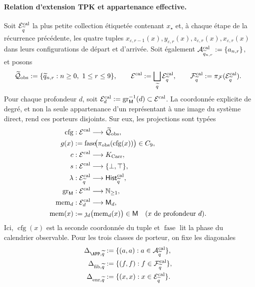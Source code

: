 \paragraph{Relation d’extension TPK et appartenance effective.}
Soit \(\mathcal E^{\rm cal}_{\widetilde q}\) la plus petite collection étiquetée contenant \(x_\star\) et, à chaque étape de la récurrence précédente, les quatre tuples \(x_{\varepsilon,r-1}(x),\allowbreak y_{\varepsilon,r}(x),\allowbreak
z_{\varepsilon,r}(x),\allowbreak x_{\varepsilon,r}(x)\) dans leurs configurations de départ et d'arrivée. Soit également \(\mathcal A^{\rm cal}_{\widetilde q_{n,r}}:=\{a_{n,r}\}\), et posons
\[
 \widetilde{\mathcal Q}_{\rm obs}:=
   \{\widetilde q_{n,r}:n\ge0,\ 1\le r\le9\},
 \qquad
 \mathcal E^{\rm cal}:=\bigsqcup_{\widetilde q}
     \mathcal E^{\rm cal}_{\widetilde q},
 \qquad
 \mathcal F^{\rm cal}_{\widetilde q}:=
     \pi_{\mathcal F}(\mathcal E^{\rm cal}_{\widetilde q}).
\]
Pour chaque profondeur \(d\), soit
\(\mathcal E^{\rm cal}_d:=
\operatorname{gr}_{\mathsf M}^{-1}(d)\subset\mathcal E^{\rm cal}\). La
coordonnée explicite de degré, et non la seule appartenance d’un représentant à
une image du système direct, rend ces porteurs disjoints. Sur eux,
les projections sont typées
\[
\begin{aligned}
 \operatorname{cfg}&:\mathcal E^{\rm cal}\longrightarrow
     \widetilde{\mathcal Q}_{\rm obs},\\
 g(x)&:=\operatorname{fase}\!
       \bigl(\pi_{\rm obs}(\operatorname{cfg}(x))\bigr)\in C_9,\\
 c&:\mathcal E^{\rm cal}\longrightarrow K_{\rm Carr},\\
 s&:\mathcal E^{\rm cal}\longrightarrow\{\bot,\top\},\\
 \lambda&:\mathcal E^{\rm cal}_{\widetilde q}
       \longrightarrow\mathsf{Hist}^{\rm cal}_{\widetilde q},\\
 \operatorname{gr}_{\mathsf M}&:\mathcal E^{\rm cal}
       \longrightarrow\mathbb N_{\ge1},\\
 \operatorname{mem}_d&:\mathcal E^{\rm cal}_d
       \longrightarrow\mathsf M_d,\\
 \operatorname{mem}(x)&:=
       \jmath_d\bigl(\operatorname{mem}_d(x)\bigr)\in\mathsf M
       \quad(x\text{ de profondeur }d).
\end{aligned}
\]
Ici, \(\operatorname{cfg}(x)\) est la seconde coordonnée du tuple et
\(\operatorname{fase}\) lit la phase du calendrier observable. Pour les trois
classes de porteur, on fixe les diagonales
\[
\begin{aligned}
 \Delta_{\APP,\widetilde q}
   &:=\{(a,a):a\in\mathcal A^{\rm cal}_{\widetilde q}\},\\
 \Delta_{{\rm fib},\widetilde q}
   &:=\{(f,f):f\in\mathcal F^{\rm cal}_{\widetilde q}\},\\
 \Delta_{{\rm enr},\widetilde q}
   &:=\{(x,x):x\in\mathcal E^{\rm cal}_{\widetilde q}\}.
\end{aligned}
\]
